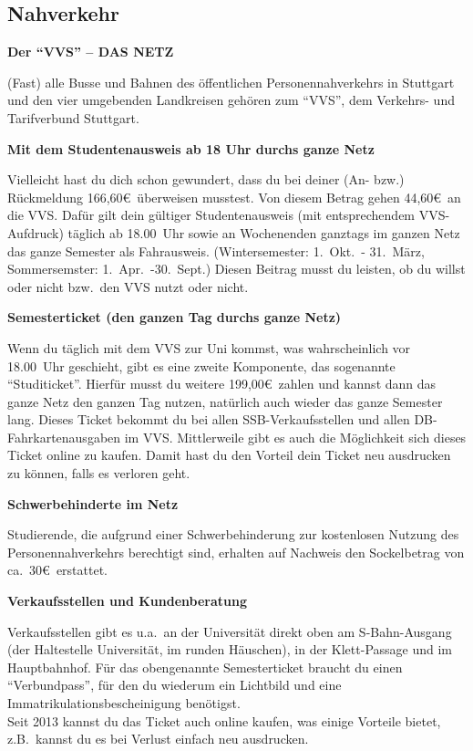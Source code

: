 \subsection{Nahverkehr}

{\large \bf Der "`VVS"' -- DAS NETZ}

(Fast) alle Busse und Bahnen des öffentlichen Personennahverkehrs
in Stuttgart und den vier umgebenden Landkreisen
gehören zum "`VVS"', dem Verkehrs- und Tarifverbund Stuttgart.

{\large \bf Mit dem Studentenausweis ab 18 Uhr durchs ganze Netz}

Vielleicht hast du dich schon gewundert,
dass du bei deiner (An- bzw.) Rückmeldung 166,60\euro\ überweisen musstest.
Von diesem Betrag gehen 44,60\euro\ an die VVS.
Dafür gilt dein gültiger Studentenausweis
(mit entsprechendem VVS-Aufdruck) täglich ab 18.00~Uhr
sowie an Wochenenden ganztags im ganzen Netz
das ganze Semester als Fahrausweis.
(Wintersemester: 1.~Okt.~- 31.~März, Sommersemster: 1.~Apr.~-30.~Sept.)
Diesen Beitrag musst du leisten,
ob du willst oder nicht bzw.~den VVS nutzt oder nicht.

{\large \bf Semesterticket (den ganzen Tag durchs ganze Netz)}

Wenn du täglich mit dem VVS zur Uni kommst,
was wahrscheinlich vor 18.00~Uhr geschieht,
gibt es eine zweite Komponente, das sogenannte "`Studiticket"'.
Hierfür musst du weitere 199,00\euro\ zahlen
und kannst dann das ganze Netz den ganzen Tag nutzen,
natürlich auch wieder das ganze Semester lang.
Dieses Ticket bekommt du bei allen SSB-Verkaufsstellen
und allen DB-Fahrkartenausgaben im VVS.
Mittlerweile gibt es auch die Möglichkeit sich dieses Ticket
online zu kaufen.
Damit hast du den Vorteil dein Ticket neu ausdrucken zu können,
falls es verloren geht.

{\large \bf Schwerbehinderte im Netz}

Studierende, die aufgrund einer Schwerbehinderung
zur kostenlosen Nutzung des Personennahverkehrs berechtigt sind,
erhalten auf Nachweis den Sockelbetrag von ca.\ 30\euro\ erstattet.

{\large \bf Verkaufsstellen und Kundenberatung}

Verkaufsstellen gibt es u.a.\ 
an der Universität direkt oben am S-Bahn-Ausgang
(der Haltestelle \glqq Universität\grqq, im runden Häuschen),
in der Klett-Passage und im Hauptbahnhof.
Für das obengenannte Semesterticket braucht du einen "`Verbundpass"',
für den du wiederum ein Lichtbild und eine
Immatrikulationsbescheinigung benötigst.\\
Seit 2013 kannst du das Ticket auch online kaufen,
was einige Vorteile bietet,
z.B.\ kannst du es bei Verlust einfach neu ausdrucken.\\[1cm]

